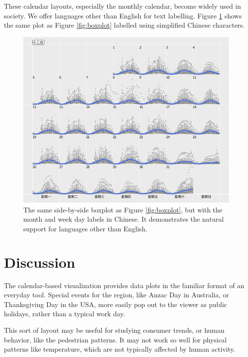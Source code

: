 \documentclass[article]{jss}
\theoremstyle{definition}
\theoremstyle{definition}
\theoremstyle{remark}
\begin{document}
These calendar layouts, especially the monthly calendar, become widely
used in society. We offer languages other than English for text
labelling. Figure \ref{fig:chn} shows the same plot as Figure
\ref{fig:boxplot} labelled using simplified Chinese characters.

\begin{CodeChunk}
\begin{figure}

{\centering \includegraphics[width=\textwidth]{figure/chn-1} 

}

\caption[The same side-by-side boxplot as Figure \ref{fig:boxplot},
but with the month and week day labels in Chinese. It demonstrates the
natural support for languages other than English.]{The same side-by-side boxplot as Figure \ref{fig:boxplot},
but with the month and week day labels in Chinese. It demonstrates the
natural support for languages other than English.}\label{fig:chn}
\end{figure}
\end{CodeChunk}





\section{Discussion}\label{discussion}

\label{sec:discussion}

The calendar-based visualization provides data plots in the familiar
format of an everyday tool. Special events for the region, like Anzac
Day in Australia, or Thanksgiving Day in the USA, more easily pop out to
the viewer as public holidays, rather than a typical work day.

This sort of layout may be useful for studying consumer trends, or human
behavior, like the pedestrian patterns. It may not work so well for
physical patterns like temperature, which are not typically affected by
human activity.


\end{document}
